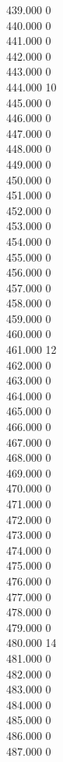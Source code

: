 { 439.000	0 \\
 440.000	0 \\
 441.000	0 \\
 442.000	0 \\
 443.000	0 \\
 444.000	10 \\
 445.000	0 \\
 446.000	0 \\
 447.000	0 \\
 448.000	0 \\
 449.000	0 \\
 450.000	0 \\
 451.000	0 \\
 452.000	0 \\
 453.000	0 \\
 454.000	0 \\
 455.000	0 \\
 456.000	0 \\
 457.000	0 \\
 458.000	0 \\
 459.000	0 \\
 460.000	0 \\
 461.000	12 \\
 462.000	0 \\
 463.000	0 \\
 464.000	0 \\
 465.000	0 \\
 466.000	0 \\
 467.000	0 \\
 468.000	0 \\
 469.000	0 \\
 470.000	0 \\
 471.000	0 \\
 472.000	0 \\
 473.000	0 \\
 474.000	0 \\
 475.000	0 \\
 476.000	0 \\
 477.000	0 \\
 478.000	0 \\
 479.000	0 \\
 480.000	14 \\
 481.000	0 \\
 482.000	0 \\
 483.000	0 \\
 484.000	0 \\
 485.000	0 \\
 486.000	0 \\
 487.000	0 \\
}
